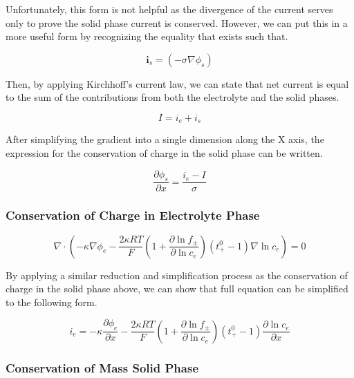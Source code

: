 \documentclass[lettersize,journal]{IEEEtran}
\begin{document}
Unfortunately, this form is not helpful as the divergence of the current serves only to prove the solid phase current is conserved. However, we can put this in a more useful form by recognizing the equality that exists such that.

\begin{equation}
\mathbf{i}_{s}=\left(-\sigma \nabla \phi_{s}\right)
\end{equation}


Then, by applying Kirchhoff's current law, we can state that net current is equal to the sum of the contributions from both the electrolyte and the solid phases.

\begin{equation}
  I = i_e + i_s
\end{equation}

After simplifying the gradient into a single dimension along the X axis, the expression for the conservation of charge in the solid phase can be written.

\begin{equation}
\frac{\partial{\phi_{s}}}{\partial{x}} = \frac{i_e - I}{\sigma}
\end{equation}


\subsubsection{Conservation of Charge in Electrolyte Phase}

\begin{equation}\label{COC_e}
\nabla \cdot\left(-\kappa \nabla \phi_{e}-\frac{2 \kappa R T}{F}\left(1+\frac{\partial \ln f_{\pm}}{\partial \ln c_{e}}\right)\left(t_{+}^{0}-1\right) \nabla \ln c_{e}\right)=0
\end{equation}

By applying a similar reduction and simplification process as the conservation of charge in the solid phase above, we can show that full equation can be simplified to the following form.

\begin{equation}
i_e = -\kappa \frac{\partial{\phi_{e}}}{\partial{x}} -\frac{2 \kappa R T}{F}\left(1+\frac{\partial \ln f_{\pm}}{\partial \ln c_{e}}\right)\left(t_{+}^{0}-1\right) \frac{\partial{\ln c_{e}}}{\partial{x}}
\end{equation}

\subsubsection{Conservation of Mass Solid Phase}
\end{document}
